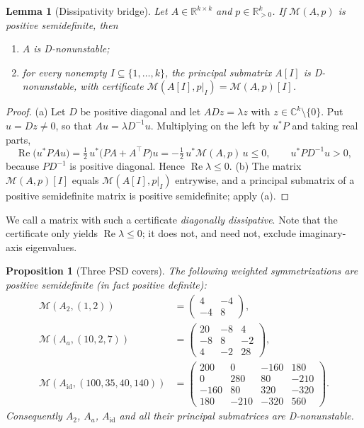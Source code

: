 \documentclass[11pt,a4paper]{article}
\newtheorem{proposition}[theorem]{Proposition}
\newtheorem{lemma}[theorem]{Lemma}
\theoremstyle{definition}
\theoremstyle{remark}
\newcommand{\R}{\mathbb{R}}
\newcommand{\C}{\mathbb{C}}
\newcommand{\re}{\operatorname{Re}}
\newcommand{\Sym}{\mathcal{M}}
\begin{document}
\begin{lemma}[Dissipativity bridge]\label{lem:bridge}
Let $A\in\R^{k\times k}$ and $p\in\R^k_{>0}$. If $\Sym(A,p)$ is positive semidefinite, then
\begin{enumerate}[label=(\alph*)]
\item $A$ is D-nonunstable;
\item for every nonempty $I\subseteq\{1,\dots,k\}$, the principal submatrix $A[I]$ is D-nonunstable, with certificate $\Sym(A[I],p|_I)=\Sym(A,p)[I]$.
\end{enumerate}
\end{lemma}

\begin{proof}
(a) Let $D$ be positive diagonal and let $ADz=\lambda z$ with $z\in\C^k\setminus\{0\}$. Put $u=Dz\ne0$, so that $Au=\lambda D^{-1}u$. Multiplying on the left by $u^{*}P$ and taking real parts,
\[
\re\bigl(u^{*}PAu\bigr)=\tfrac12\,u^{*}\bigl(PA+A^{\top}P\bigr)u=-\tfrac12\,u^{*}\Sym(A,p)\,u\le0,
\qquad
u^{*}PD^{-1}u>0,
\]
because $PD^{-1}$ is positive diagonal. Hence $\re\lambda\le0$.
(b) The matrix $\Sym(A,p)[I]$ equals $\Sym(A[I],p|_I)$ entrywise, and a principal submatrix of a positive semidefinite matrix is positive semidefinite; apply (a).
\end{proof}

We call a matrix with such a certificate \emph{diagonally dissipative}. Note that the certificate only yields $\re\lambda\le0$; it does not, and need not, exclude imaginary-axis eigenvalues.

\begin{proposition}[Three PSD covers]\label{prop:psd}
The following weighted symmetrizations are positive semidefinite (in fact positive definite):
\begin{align*}
\Sym(A_2,(1,2))&=\begin{pmatrix}4&-4\\-4&8\end{pmatrix},\\
\Sym(A_a,(10,2,7))&=\begin{pmatrix}20&-8&4\\-8&8&-2\\4&-2&28\end{pmatrix},\\
\Sym(A_{\mathrm{id}},(100,35,40,140))&=\begin{pmatrix}200&0&-160&180\\0&280&80&-210\\-160&80&320&-320\\180&-210&-320&560\end{pmatrix}.
\end{align*}
Consequently $A_2$, $A_a$, $A_{\mathrm{id}}$ and all their principal submatrices are D-nonunstable.
\end{proposition}
\end{document}

